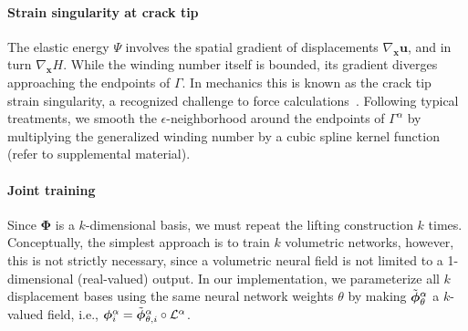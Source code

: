 \paragraph{Strain singularity at crack tip}
The elastic energy $\Psi$ involves the spatial gradient of displacements $\nabla_{\bm{x}}\bm{u}$, and in turn $\nabla_{\bm{x}}H$. While the winding number itself is bounded, its gradient diverges approaching the endpoints of $\Gamma$. In mechanics this is known as the crack tip strain singularity, a recognized challenge to force calculations~\cite{Mousavi:XFEM:2011}.  Following typical treatments, we smooth the $\epsilon$-neighborhood around the endpoints of $\Gamma^\alpha$ by multiplying the generalized winding number by a cubic spline kernel function (refer to supplemental material).

\paragraph{Joint training}
Since $\bm{\Phi}$ is a $k$-dimensional basis, we must repeat the lifting construction $k$ times. Conceptually, the simplest approach is to train $k$ volumetric networks, however, this is not strictly necessary, since a volumetric neural field is not limited to a 1-dimensional (real-valued) output. In our implementation, we parameterize all $k$ displacement bases using the same neural network weights $\theta$ by making $\Tilde{\bm{\phi}}_\theta^\alpha$ a $k$-valued field, i.e.,
$\bm{\phi}_i^\alpha = \Tilde{\bm{\phi}}_{\theta,i}^\alpha \circ \mathcal{L}^{\alpha}$.



